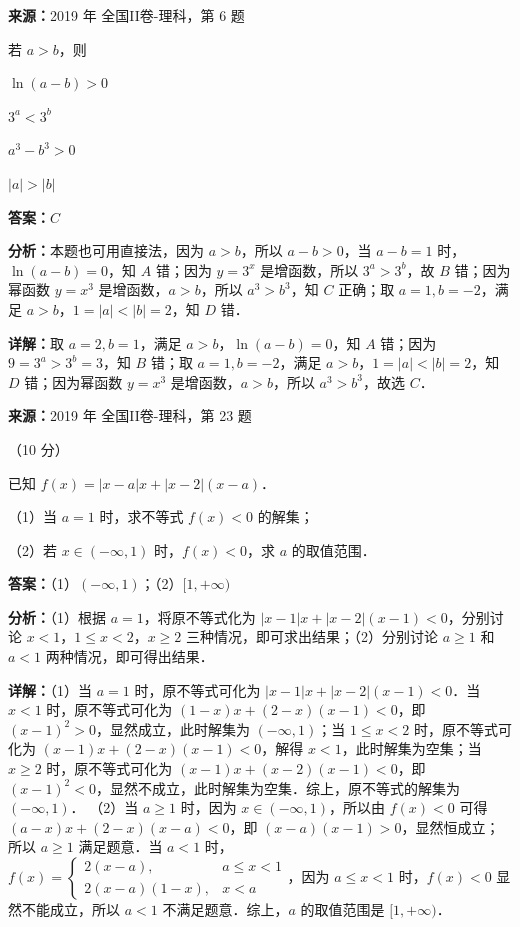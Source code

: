 \begin{question}[points=5]
\textbf{来源：}2019 年 全国II卷-理科，第 6 题\par
若 $a>b$，则
\begin{choices}
  \item $\ln(a-b)>0$
  \item $3^a<3^b$
  \item $a^3-b^3>0$
  \item $|a|>|b|$
\end{choices}
\begin{solution}
\textbf{答案：}$C$

\textbf{分析：}本题也可用直接法，因为 $a>b$，所以 $a-b>0$，当 $a-b=1$ 时，$\ln(a-b)=0$，知 $A$ 错；因为 $y=3^x$ 是增函数，所以 $3^a>3^b$，故 $B$ 错；因为幂函数 $y=x^3$ 是增函数，$a>b$，所以 $a^3>b^3$，知 $C$ 正确；取 $a=1,b=-2$，满足 $a>b$，$1=|a|<|b|=2$，知 $D$ 错．

\textbf{详解：}取 $a=2,b=1$，满足 $a>b$，$\ln(a-b)=0$，知 $A$ 错；因为 $9=3^a>3^b=3$，知 $B$ 错；取 $a=1,b=-2$，满足 $a>b$，$1=|a|<|b|=2$，知 $D$ 错；因为幂函数 $y=x^3$ 是增函数，$a>b$，所以 $a^3>b^3$，故选 $C$．
\end{solution}
\end{question}

\begin{question}[points=10]
\textbf{来源：}2019 年 全国II卷-理科，第 23 题\par
[选修 4-5：不等式选讲]（10 分）

已知 $f(x)=|x-a|x+|x-2|(x-a)$．

（1）当 $a=1$ 时，求不等式 $f(x)<0$ 的解集；

（2）若 $x\in(-\infty,1)$ 时，$f(x)<0$，求 $a$ 的取值范围．
\begin{solution}
\textbf{答案：}（1）$(-\infty,1)$；（2）$[1,+\infty)$

\textbf{分析：}（1）根据 $a=1$，将原不等式化为 $|x-1|x+|x-2|(x-1)<0$，分别讨论 $x<1$，$1\leq x<2$，$x\geq 2$ 三种情况，即可求出结果；（2）分别讨论 $a\geq 1$ 和 $a<1$ 两种情况，即可得出结果．

\textbf{详解：}（1）当 $a=1$ 时，原不等式可化为 $|x-1|x+|x-2|(x-1)<0$．当 $x<1$ 时，原不等式可化为 $(1-x)x+(2-x)(x-1)<0$，即 $(x-1)^2>0$，显然成立，此时解集为 $(-\infty,1)$；当 $1\leq x<2$ 时，原不等式可化为 $(x-1)x+(2-x)(x-1)<0$，解得 $x<1$，此时解集为空集；当 $x\geq 2$ 时，原不等式可化为 $(x-1)x+(x-2)(x-1)<0$，即 $(x-1)^2<0$，显然不成立，此时解集为空集．综上，原不等式的解集为 $(-\infty,1)$．
（2）当 $a\geq 1$ 时，因为 $x\in(-\infty,1)$，所以由 $f(x)<0$ 可得 $(a-x)x+(2-x)(x-a)<0$，即 $(x-a)(x-1)>0$，显然恒成立；所以 $a\geq 1$ 满足题意．当 $a<1$ 时，$f(x)=\begin{cases} 2(x-a), & a\leq x<1 \\ 2(x-a)(1-x), & x<a \end{cases}$，因为 $a\leq x<1$ 时，$f(x)<0$ 显然不能成立，所以 $a<1$ 不满足题意．综上，$a$ 的取值范围是 $[1,+\infty)$．
\end{solution}
\end{question}

